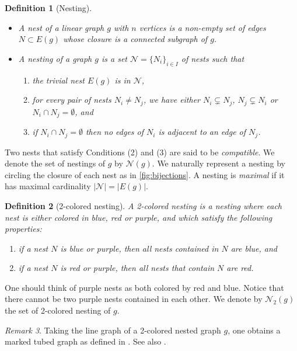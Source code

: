 \documentclass[twoside, 12pt]{amsart}
\newtheorem{definition}{Definition}[section]
\theoremstyle{remark}
\newtheorem{remark}[definition]{\sc Remark}
\begin{document}
\begin{definition}[Nesting]
\leavevmode
\begin{itemize}
\item A \emph{nest} of a linear graph $g$ with $n$ vertices is a non-empty set of edges $N \subset E(g)$ whose closure is a connected subgraph of $g$.
\item A \emph{nesting} of a graph $g$ is a set $\mathcal{N}=\{N_i\}_{i\in I}$ of nests such that 
\begin{enumerate}
    \item the \emph{trivial nest} $E(g)$ is in $\mathcal{N}$,
    \item for every pair of nests $N_i\neq N_j$, we have either $N_i \subsetneq N_j$, $N_j \subsetneq N_i$ or $N_i \cap N_j = \emptyset$, and
    \item if $N_i \cap N_j = \emptyset$ then no edges of $N_i$ is adjacent to an edge of $N_j$.
\end{enumerate}
\end{itemize}
\end{definition}

Two nests that satisfy Conditions (2) and (3) are said to be \textit{compatible}. We denote the set of nestings of $g$ by $\mathcal{N}(g)$. We naturally represent a nesting by circling the closure of each nest as in \cref{fig:bijections}. A nesting is \emph{maximal} if it has maximal cardinality $|\mathcal{N}|=|E(g)|$.

\begin{definition}[2-colored nesting] A \emph{2-colored nesting} is a nesting where each nest is either colored in blue, red or purple, and which satisfy the following properties: 
\begin{enumerate}
  \item if a nest $N$ is blue or purple, then all nests contained in $N$ are blue, and 
  \item if a nest $N$ is red or purple, then all nests that contain $N$ are red.
\end{enumerate}
\end{definition}
One should think of purple nests as both colored by red and blue. Notice that there cannot be two purple nests contained in each other. 
We denote by $\mathcal{N}_2(g)$ the set of 2-colored nesting of $g$.

\begin{remark} 
Taking the line graph of a 2-colored nested graph $g$, one obtains a marked tubed graph as defined in \cite{DevadossForcey08}. 
See also \cite[Remark 2.4]{LA21}.
\end{remark}
\end{document}
